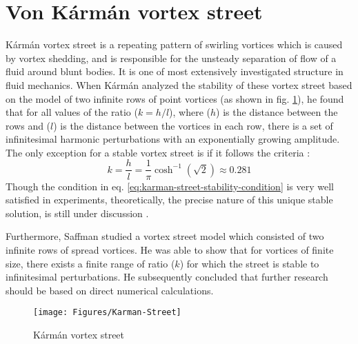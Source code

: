 \section{Von Kármán vortex street}
Kármán vortex street is a repeating pattern of swirling vortices which is caused by vortex shedding, and is responsible for the unsteady separation of flow of a fluid around blunt bodies. It is one of most extensively investigated structure in fluid mechanics.
When Kármán analyzed the stability of these vortex street based on the model of two infinite rows of point vortices (as shown in fig. \ref{fig:karman-vortex-street}), he found that for all values of the ratio ($k = h/l$), where ($h$) is the distance between the rows and ($l$) is the distance between the vortices in each row, there is a set of infinitesimal harmonic perturbations with an exponentially growing amplitude. The only exception for a stable vortex street is if it follows the criteria \parencite{Karmán1912}:
\begin{equation}
	k = \frac{h}{l} = \frac{1}{\pi} \cosh^{-1}(\sqrt{2}) \approx 0.281
	\label{eq:karman-street-stability-condition}
\end{equation}
Though the condition in eq. \ref{eq:karman-street-stability-condition} is very well satisfied in experiments, theoretically, the precise nature of this unique stable solution, is still under discussion \parencite{jimenez1987linear}.

Furthermore, Saffman \parencite{saffman1982stability} studied a vortex street model which consisted of two infinite rows of spread vortices. He was able to show that for vortices of finite size, there exists a finite range of ratio ($k$) for which the street is stable to infinitesimal perturbations. He subsequently concluded that further research should be based on direct numerical calculations.
\begin{figure}[H]
	\centering
	\texttt{[image: Figures/Karman-Street]}
	\caption{Kármán vortex street}
	\label{fig:karman-vortex-street}
\end{figure}


